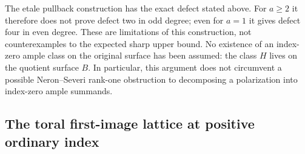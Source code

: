 \begin{remark}
\label{rem:DE-A3-positive-index-gate}
The etale pullback construction has the exact defect stated above.
For $a\ge2$ it therefore does not prove defect two in odd degree;
even for $a=1$ it gives defect four in even degree.
These are limitations of this construction, not counterexamples
to the expected sharp upper bound.
No existence of an index-zero ample class on the original surface
has been assumed: the class $H$ lives on the quotient surface $B$.
In particular, this argument does not circumvent a possible
Neron--Severi rank-one obstruction to decomposing a polarization
into index-zero ample summands.
\end{remark}


\subsection{The toral first-image lattice at positive ordinary index}

